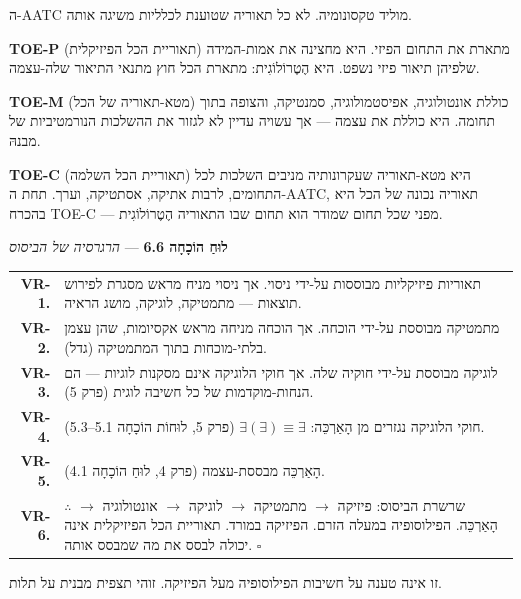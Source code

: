 \documentclass[10pt, openany, oneside]{book}
\renewcommand{\footnotesize}{\fontsize{8.5}{11}\selectfont}
\begin{document}
\vspace{1em}

\noindent ה-AATC מוליד טקסונומיה. לא כל תאוריה שטוענת לכלליות משיגה אותה.

\textbf{TOE-P} (תאוריית הכל הפיזיקלית) מתארת את התחום הפיזי. היא מחצינה את אמות-המידה שלפיהן תיאור פיזי נשפט. היא הֶטֶרוֹלוֹגִית: מתארת הכל חוץ מתנאי התיאור שלה-עצמה.

\textbf{TOE-M} (מטא-תאוריה של הכל) כוללת אונטולוגיה, אפיסטמולוגיה, סמנטיקה, והצופה בתוך תחומה. היא כוללת את עצמה — אך עשויה עדיין לא לגזור את ההשלכות הנורמטיביות של מבנהּ.

\textbf{TOE-C} (תאוריית הכל השלמה) היא מטא-תאוריה שעקרונותיה מניבים השלכות לכל התחומים, לרבות אתיקה, אסתטיקה, וערך. תחת ה-AATC, תאוריה נכונה של הכל היא בהכרח TOE-C — מפני שכל תחום שמודר הוא תחום שבו התאוריה הֶטֶרוֹלוֹגִית.

\vspace{0.5em}

\textbf{לוּחַ הוֹכָחָה 6.6} --- \textit{הרגרסיה של הביסוס}

\vspace{0.5em}

{\footnotesize
\noindent\begin{tabular}{r p{}}
\textbf{VR-1.} & תאוריות פיזיקליות מבוססות על-ידי ניסוי. אך ניסוי מניח מראש מסגרת לפירוש תוצאות — מתמטיקה, לוגיקה, מושג הראיה. \\[0.3em]
\textbf{VR-2.} & מתמטיקה מבוססת על-ידי הוכחה. אך הוכחה מניחה מראש אקסיומות, שהן עצמן בלתי-מוכחות בתוך המתמטיקה (גדל). \\[0.3em]
\textbf{VR-3.} & לוגיקה מבוססת על-ידי חוקיה שלה. אך חוקי הלוגיקה אינם מסקנות לוגיות — הם הנחות-מוקדמות של כל חשיבה לוגית (פרק 5). \\[0.3em]
\textbf{VR-4.} & חוקי הלוגיקה נגזרים מן הָאַרְכֵּה: $\exists(\exists) \equiv \exists$ (פרק 5, לוּחוֹת הוֹכָחָה 5.1–5.3). \\[0.3em]
\textbf{VR-5.} & הָאַרְכֵּה מבססת-עצמה (פרק 4, לוּחַ הוֹכָחָה 4.1). \\[0.3em]
\textbf{VR-6.} & $\therefore$ שרשרת הביסוס: פיזיקה $\to$ מתמטיקה $\to$ לוגיקה $\to$ אונטולוגיה $\to$ הָאַרְכֵּה. הפילוסופיה במעלה הזרם. הפיזיקה במורד. תאוריית הכל הפיזיקלית אינה יכולה לבסס את מה שמבסס אותה. $\square$ \\[0.3em]
\end{tabular}
}

\vspace{0.8em}

\noindent זו אינה טענה על חשיבות הפילוסופיה מעל הפיזיקה. זוהי תצפית מבנית על תלות.
\end{document}
